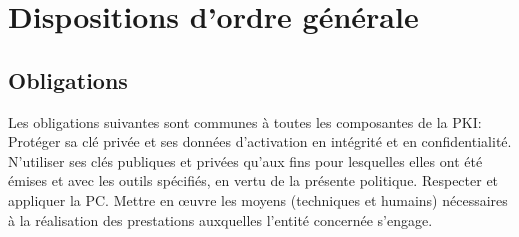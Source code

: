 \documentclass[a4paper,11pt,french]{book}
\begin{document}
\section{Dispositions d'ordre générale}
\subsection{Obligations}
Les obligations suivantes sont communes à toutes les composantes de la PKI:
Protéger sa clé privée et ses données d’activation en intégrité et en confidentialité.
N’utiliser ses clés publiques et privées qu’aux fins pour lesquelles elles ont été émises et avec les outils spécifiés, en vertu de la présente politique.
Respecter et appliquer la PC.
Mettre en œuvre les moyens (techniques et humains) nécessaires à la réalisation des prestations auxquelles l’entité concernée s’engage.
\end{document}
